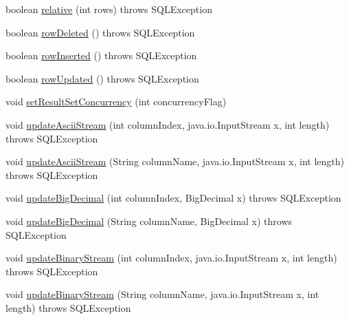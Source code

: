 \begin{DoxyCompactItemize}
boolean \mbox{\hyperlink{classcom_1_1mysql_1_1cj_1_1jdbc_1_1result_1_1_updatable_result_set_a0eb56ce5c9b20cf4861f3222dc2ee630}{relative}} (int rows)  throws S\+Q\+L\+Exception 
\item 
boolean \mbox{\hyperlink{classcom_1_1mysql_1_1cj_1_1jdbc_1_1result_1_1_updatable_result_set_abf292b9cc9ad09a378a7c7626ff84b6d}{row\+Deleted}} ()  throws S\+Q\+L\+Exception 
\item 
boolean \mbox{\hyperlink{classcom_1_1mysql_1_1cj_1_1jdbc_1_1result_1_1_updatable_result_set_acb0af01c76787058c6c6d9606d200dc1}{row\+Inserted}} ()  throws S\+Q\+L\+Exception 
\item 
boolean \mbox{\hyperlink{classcom_1_1mysql_1_1cj_1_1jdbc_1_1result_1_1_updatable_result_set_a043afc3c3a1071615bb1af7386a3d5bf}{row\+Updated}} ()  throws S\+Q\+L\+Exception 
\item 
void \mbox{\hyperlink{classcom_1_1mysql_1_1cj_1_1jdbc_1_1result_1_1_updatable_result_set_a6aa359dffbca97bd2ca0c71429ab1119}{set\+Result\+Set\+Concurrency}} (int concurrency\+Flag)
\item 
void \mbox{\hyperlink{classcom_1_1mysql_1_1cj_1_1jdbc_1_1result_1_1_updatable_result_set_abb0e30423b400fc6e907b5388ae3b4dd}{update\+Ascii\+Stream}} (int column\+Index, java.\+io.\+Input\+Stream x, int length)  throws S\+Q\+L\+Exception 
\item 
void \mbox{\hyperlink{classcom_1_1mysql_1_1cj_1_1jdbc_1_1result_1_1_updatable_result_set_ad1d5c51538ff6b32e8468c1ce8622834}{update\+Ascii\+Stream}} (String column\+Name, java.\+io.\+Input\+Stream x, int length)  throws S\+Q\+L\+Exception 
\item 
void \mbox{\hyperlink{classcom_1_1mysql_1_1cj_1_1jdbc_1_1result_1_1_updatable_result_set_a28b5d74d78a69056aba8ebf47df1fc93}{update\+Big\+Decimal}} (int column\+Index, Big\+Decimal x)  throws S\+Q\+L\+Exception 
\item 
void \mbox{\hyperlink{classcom_1_1mysql_1_1cj_1_1jdbc_1_1result_1_1_updatable_result_set_a3ff33f1d3d288c388a2fdfae180952bc}{update\+Big\+Decimal}} (String column\+Name, Big\+Decimal x)  throws S\+Q\+L\+Exception 
\item 
void \mbox{\hyperlink{classcom_1_1mysql_1_1cj_1_1jdbc_1_1result_1_1_updatable_result_set_ad570ab6558e64594bcd639021d762cc5}{update\+Binary\+Stream}} (int column\+Index, java.\+io.\+Input\+Stream x, int length)  throws S\+Q\+L\+Exception 
\item 
void \mbox{\hyperlink{classcom_1_1mysql_1_1cj_1_1jdbc_1_1result_1_1_updatable_result_set_aa271ae53fc1747a90624c45cb6c61fbc}{update\+Binary\+Stream}} (String column\+Name, java.\+io.\+Input\+Stream x, int length)  throws S\+Q\+L\+Exception 

\end{DoxyCompactItemize}

